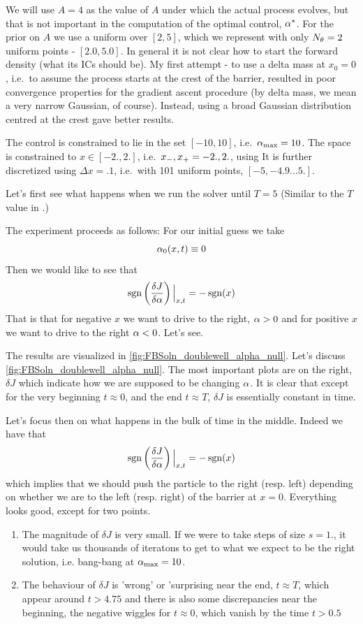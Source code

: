 \documentclass{article}
\begin{document}
We will use $A = 4$ as the value of $A$ under which the actual process evolves,
but that is not important in the computation of the optimal control, ${\alpha}^*$. For
the prior on $A$ we use a uniform over $[2,5]$, which we represent with
only $N_{\theta} = 2$ uniform points - $[2.0, 5.0]$.  In general it is
not clear how to start the forward density (what its ICs should be). 
My first attempt - to use a delta mass at $x_0 = 0$, i.e.\ to assume the
process starts at the crest of the barrier, resulted in poor convergence
properties for the gradient ascent procedure (by delta mass, we mean a very
narrow Gaussian, of course). Instead, using a broad Gaussian distribution
centred at the crest gave better results. 

The control is constrained to lie in the set $[-10, 10]$, i.e.\ ${ {\alpha}_{\textrm{max}} } = 10$.
The space is constrained to $x \in [-2.,2.]$, i.e.\ ${ x_{-} }, { x_{+} } = -2.,2.$,
using  It is further discretized using $\Delta x = .1$, i.e.\ with 101 uniform
points, $[-5, -4.9\ldots 5.]$.

Let's first see what happens when we run the solver until $T = 5$ (Similar to
the $T$ value in \cite{Lin}.)

The experiment proceeds as follows: For our initial guess we take $${\alpha}_0(x,t)
\equiv 0$$ Then we would like to see that 
$$ \operatorname{sgn} \left(\frac {\delta J}{\delta {\alpha}}\right) \Big|_{x,t} = - \operatorname{sgn}(x)$$
That is that for negative $x$ we want to drive to the right, ${\alpha} > 0$ and for
positive $x$ we want to drive to the right ${\alpha} < 0$. 
Let's see.  

The results are visualized in \cref{fig:FBSoln_doublewell_alpha_null}. Let's
discuss \cref{fig:FBSoln_doublewell_alpha_null}. The most important plots are on
the right, $\delta J$ which indicate how we are supposed to be changing ${\alpha}$. 
It is clear that except for the very beginning $t \approx 0$, and the end $t
\approx T$, $\delta J$ is essentially constant in time.  

Let's focus then on what happens in the bulk of time in the middle. Indeed we  
have that 
$$
\operatorname{sgn} \left(\frac {\delta J}{\delta {\alpha}}\right) \Big|_{x,t} = - \operatorname{sgn}(x)
$$
which implies that we should push the particle to the right (resp. left)
depending on whether we are to the left (resp. right) of the barrier at $x=0$.
Everything looks good, except for two points.
\begin{enumerate}
  \item The magnitude of $\delta J$ is very small. If we were to take steps of
  size $s=1.$, it would take us thousands of iteratons to get to what we expect to be
the right solution, i.e. bang-bang at ${ {\alpha}_{\textrm{max}} } = 10$.
\item The behaviour of $\delta J$ is 'wrong' or 'surprising near the end, $t
\approx T$, which appear around $t>4.75$ and there is also some discrepancies
near the beginning, the negative wiggles for $t \approx 0$, which vanish by the
time $t > 0.5$
\end{enumerate}
\end{document}
